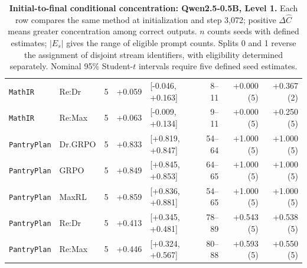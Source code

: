 \begin{table}[!htbp]
\begin{tabular}{@{}llcrlrrr@{}}
\texttt{MathIR} & Re:Dr & 5 & +0.059 & [-0.046, +0.163] & 8--11 & +0.000 (5) & +0.367 (2) \\
\texttt{MathIR} & Re:Max & 5 & +0.063 & [-0.009, +0.134] & 9--11 & +0.000 (5) & +0.250 (5) \\
\texttt{PantryPlan} & Dr.GRPO & 5 & +0.833 & [+0.819, +0.847] & 54--64 & +1.000 (5) & +1.000 (5) \\
\texttt{PantryPlan} & GRPO & 5 & +0.849 & [+0.845, +0.853] & 64--65 & +1.000 (5) & +1.000 (5) \\
\texttt{PantryPlan} & MaxRL & 5 & +0.859 & [+0.836, +0.881] & 54--65 & +1.000 (5) & +1.000 (5) \\
\texttt{PantryPlan} & Re:Dr & 5 & +0.413 & [+0.345, +0.481] & 78--89 & +0.543 (5) & +0.538 (5) \\
\texttt{PantryPlan} & Re:Max & 5 & +0.446 & [+0.324, +0.567] & 80--88 & +0.593 (5) & +0.550 (5) \\
\bottomrule
\end{tabular}
\caption{\textbf{Initial-to-final conditional concentration: Qwen2.5-0.5B, Level 1.} Each row compares the same method at initialization and step 3,072; positive $\Delta\widehat C$ means greater concentration among correct outputs. $n$ counts seeds with defined estimates; $|E_s|$ gives the range of eligible prompt counts. Splits 0 and 1 reverse the assignment of disjoint stream identifiers, with eligibility determined separately. Nominal 95\% Student-$t$ intervals require five defined seed estimates.}
\end{table}

